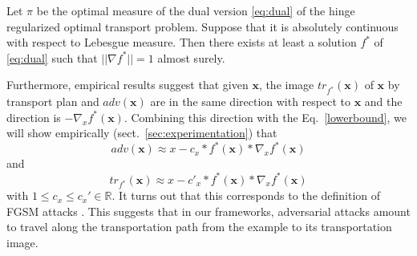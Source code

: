 \begin{Proposition}\label{coro_norm1}
Let $\pi$ be the optimal measure of the dual version \eqref{eq:dual} of the hinge regularized optimal transport problem. Suppose that it is absolutely continuous with respect to Lebesgue measure. Then there exists at least a solution $f^*$ of \eqref{eq:dual} such that $||\nabla f^*||=1$ almost surely.
\end{Proposition}
Furthermore, empirical results suggest that given $\textbf{x}$, the image $tr_{f^*}(\textbf{x})$ of $\textbf{x}$ by transport plan and $adv(\textbf{x})$ are in the same direction with respect to $\textbf{x}$ and the direction is %
 $-\nabla_x f^*(\textbf{x})$. Combining this direction with the Eq.~\eqref{lowerbound}, we will show empirically (sect.~\ref{sec:experimentation}) that  $$adv(\textbf{x})\approx x-c_x*f^*(\textbf{x})*\nabla_x f^*(\textbf{x})$$ and $$tr_{f^*}(\textbf{x})\approx x-c'_x*f^*(\textbf{x})*\nabla_x f^*(\textbf{x})$$ with $1 \leq c_x \leq c_x' \in \mathbb{R} $. It turns out that this corresponds to the definition of FGSM attacks \cite{Goodfellow2014a}. This suggests that in our frameworks, adversarial attacks amount to travel along the transportation path from the example to its transportation image.
 
